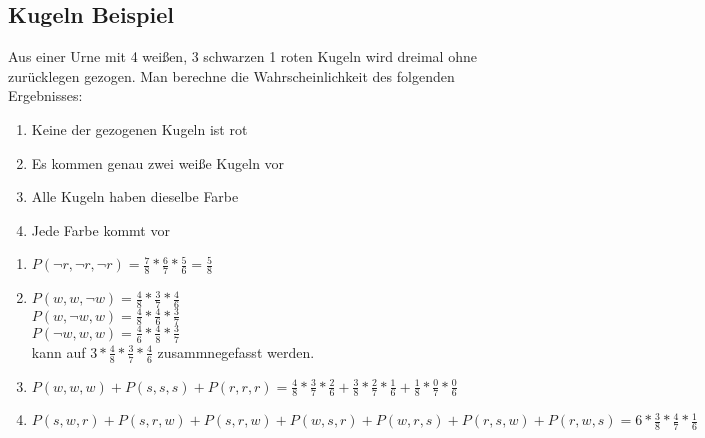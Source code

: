 \newpage
\subsection{Kugeln Beispiel}

Aus einer Urne mit 4 weißen, 3 schwarzen 1 roten Kugeln wird dreimal ohne zurücklegen gezogen. Man berechne die
Wahrscheinlichkeit des folgenden Ergebnisses:

\begin{enumerate}
    \item Keine der gezogenen Kugeln ist rot
    \item Es kommen genau zwei weiße Kugeln vor
    \item Alle Kugeln haben dieselbe Farbe
    \item Jede Farbe kommt vor
\end{enumerate}


\hfill \break
\begin{enumerate}
    \item $P(\lnot r,\lnot r,\lnot r) = \frac{7}{8}*\frac{6}{7}*\frac{5}{6} = \frac{5}{8}$
    \item
          $P(w,w,\lnot w) = \frac{4}{8}*\frac{3}{7}*\frac{4}{6}$\\
          $P(w,\lnot w,w) = \frac{4}{8}*\frac{4}{6}*\frac{3}{7}$\\
          $P(\lnot w,w,w) = \frac{4}{6}*\frac{4}{8}*\frac{3}{7}$\\
          kann auf $3*\frac{4}{8}*\frac{3}{7}*\frac{4}{6}$ zusammnegefasst werden.
    \item $P(w,w,w)+P(s,s,s)+P(r,r,r) = \frac{4}{8}*\frac{3}{7}*\frac{2}{6}+\frac{3}{8}*\frac{2}{7}*\frac{1}{6}+\frac{1}{8}*\frac{0}{7}*\frac{0}{6}$
    \item $P(s,w,r)+P(s,r,w)+P(s,r,w)+P(w,s,r)+P(w,r,s)+P(r,s,w)+P(r,w,s) = 6*\frac{3}{8}*\frac{4}{7}*\frac{1}{6}$
\end{enumerate}